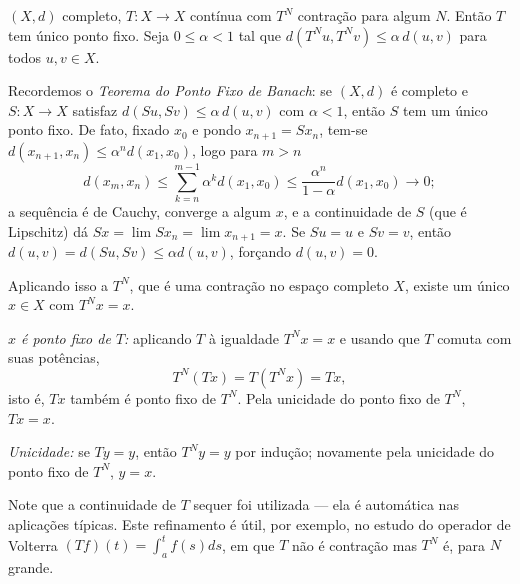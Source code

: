 \begin{exercicio}{$(X,d)$ completo, $T:X\to X$ contínua com $T^N$ contração para algum $N$. Então $T$ tem único ponto fixo.}
\sol
Seja $0\le\alpha<1$ tal que $d(T^Nu,T^Nv)\le\alpha\,d(u,v)$ para todos $u,v\in X$.

Recordemos o \emph{Teorema do Ponto Fixo de Banach}: se $(X,d)$ é completo e $S:X\to X$ satisfaz $d(Su,Sv)\le\alpha\,d(u,v)$ com $\alpha<1$, então $S$ tem um único ponto fixo. De fato, fixado $x_0$ e pondo $x_{n+1}=Sx_n$, tem-se $d(x_{n+1},x_n)\le\alpha^n d(x_1,x_0)$, logo para $m>n$
\[ d(x_m,x_n)\le\sum_{k=n}^{m-1}\alpha^k d(x_1,x_0)\le\frac{\alpha^n}{1-\alpha}d(x_1,x_0)\longrightarrow0; \]
a sequência é de Cauchy, converge a algum $x$, e a continuidade de $S$ (que é Lipschitz) dá $Sx=\lim Sx_n=\lim x_{n+1}=x$. Se $Su=u$ e $Sv=v$, então $d(u,v)=d(Su,Sv)\le\alpha d(u,v)$, forçando $d(u,v)=0$.

Aplicando isso a $T^N$, que é uma contração no espaço completo $X$, existe um único $x\in X$ com $T^Nx=x$.

\emph{$x$ é ponto fixo de $T$:} aplicando $T$ à igualdade $T^Nx=x$ e usando que $T$ comuta com suas potências,
\[ T^N(Tx)=T(T^Nx)=Tx, \]
isto é, $Tx$ também é ponto fixo de $T^N$. Pela unicidade do ponto fixo de $T^N$, $Tx=x$.

\emph{Unicidade:} se $Ty=y$, então $T^Ny=y$ por indução; novamente pela unicidade do ponto fixo de $T^N$, $y=x$.

\begin{obs}
Note que a continuidade de $T$ sequer foi utilizada --- ela é automática nas aplicações típicas. Este refinamento é útil, por exemplo, no estudo do operador de Volterra $ (Tf)(t)=\int_a^t f(s)ds$, em que $T$ não é contração mas $T^N$ é, para $N$ grande.
\end{obs}
\end{exercicio}

